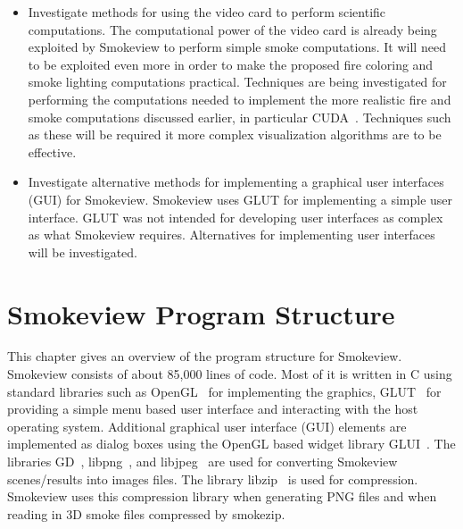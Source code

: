 \documentclass[11pt,twoside]{book}
\begin{document}
\begin{itemize}

\item Investigate methods for using the video card to perform
scientific computations. The computational power of the video card
is already  being exploited by Smokeview to perform simple smoke
computations. It will need to be exploited even more in order to
make the proposed fire coloring and smoke lighting computations
practical. Techniques are being investigated for performing the
computations needed to implement the more realistic fire and smoke
computations discussed earlier, in particular CUDA~\cite{CUDA}.
Techniques such as these will be required it more complex
visualization algorithms are to be effective.

\item Investigate alternative methods for implementing a graphical
user interfaces (GUI) for Smokeview. Smokeview uses GLUT for
implementing a simple user interface.  GLUT was not intended for
developing user interfaces as complex as what Smokeview requires.
Alternatives for implementing user interfaces will be
investigated.

\end{itemize}

%
%




%
%

\appendix
{}


%
%

\chapter{Smokeview Program Structure}
\label{smvprogstruct}

This chapter gives an overview of the program structure for
Smokeview. Smokeview consists of about 85,000 lines of code.  Most
of it is written in C using standard libraries such as
OpenGL~\cite{OpenGLRed} for implementing the graphics,
GLUT~\cite{OpenGLGlut} for providing a simple menu based user
interface and interacting with the host operating system.
Additional graphical user interface (GUI) elements are implemented
as dialog boxes using the OpenGL based widget library
GLUI~\cite{GLUILIB}. The libraries GD~\cite{GDLIB},
libpng~\cite{PNGLIB}, and libjpeg~\cite{JPEGLIB} are used for
converting Smokeview scenes/results into images files. The library
libzip~\cite{ZLIB} is used for compression. Smokeview uses this
compression library when generating PNG files and when reading in
3D smoke files compressed by smokezip.
\end{document}

